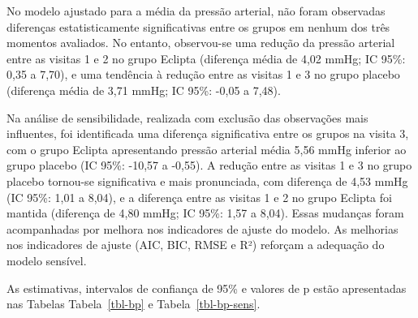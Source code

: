 \documentclass[
  12pt,
]{article}
\begin{document}
No modelo ajustado para a média da pressão arterial, não foram
observadas diferenças estatisticamente significativas entre os grupos em
nenhum dos três momentos avaliados. No entanto, observou-se uma redução
da pressão arterial entre as visitas 1 e 2 no grupo Eclipta (diferença
média de 4,02 mmHg; IC 95\%: 0,35 a 7,70), e uma tendência à redução
entre as visitas 1 e 3 no grupo placebo (diferença média de 3,71 mmHg;
IC 95\%: -0,05 a 7,48).

Na análise de sensibilidade, realizada com exclusão das observações mais
influentes, foi identificada uma diferença significativa entre os grupos
na visita 3, com o grupo Eclipta apresentando pressão arterial média
5,56 mmHg inferior ao grupo placebo (IC 95\%: -10,57 a -0,55). A redução
entre as visitas 1 e 3 no grupo placebo tornou-se significativa e mais
pronunciada, com diferença de 4,53 mmHg (IC 95\%: 1,01 a 8,04), e a
diferença entre as visitas 1 e 2 no grupo Eclipta foi mantida (diferença
de 4,80 mmHg; IC 95\%: 1,57 a 8,04). Essas mudanças foram acompanhadas
por melhora nos indicadores de ajuste do modelo. As melhorias nos
indicadores de ajuste (AIC, BIC, RMSE e R²) reforçam a adequação do
modelo sensível.

As estimativas, intervalos de confiança de 95\% e valores de p estão
apresentadas nas Tabelas Tabela~\ref{tbl-bp} e Tabela~\ref{tbl-bp-sens}.
\end{document}
